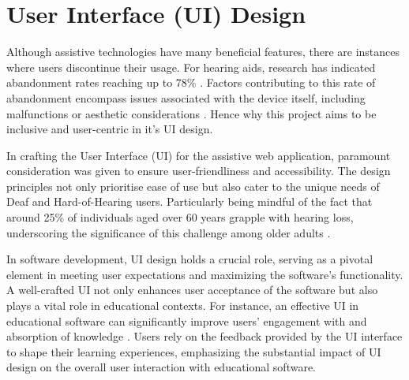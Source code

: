 \documentclass{l4proj}
\begin{document}
\section{User Interface (UI) Design}
\label{sec:UI}

Although assistive technologies have many beneficial features, there are instances where users discontinue their usage. For hearing aids, research has indicated abandonment rates reaching up to 78\% \citep{scherer1996outcomes}. Factors contributing to this rate of abandonment encompass issues associated with the device itself, including malfunctions or aesthetic considerations \citep{ijerph18147259}. Hence why this project aims to be inclusive and user-centric in it's UI design. 

In crafting the User Interface (UI) for the assistive web application, paramount consideration was given to ensure user-friendliness and accessibility. The design principles not only prioritise ease of use but also cater to the unique needs of Deaf and Hard-of-Hearing users. Particularly being mindful of the fact that around 25\% of individuals aged over 60 years grapple with hearing loss, underscoring the significance of this challenge among older adults \citep{haile2021hearing}.

In software development, UI design holds a crucial role, serving as a pivotal element in meeting user expectations and maximizing the software's functionality. A well-crafted UI not only enhances user acceptance of the software but also plays a vital role in educational contexts. For instance, an effective UI in educational software can significantly improve users' engagement with and absorption of knowledge \citep{chu1998evolution}. Users rely on the feedback provided by the UI interface to shape their learning experiences, emphasizing the substantial impact of UI design on the overall user interaction with educational software.
\end{document}
